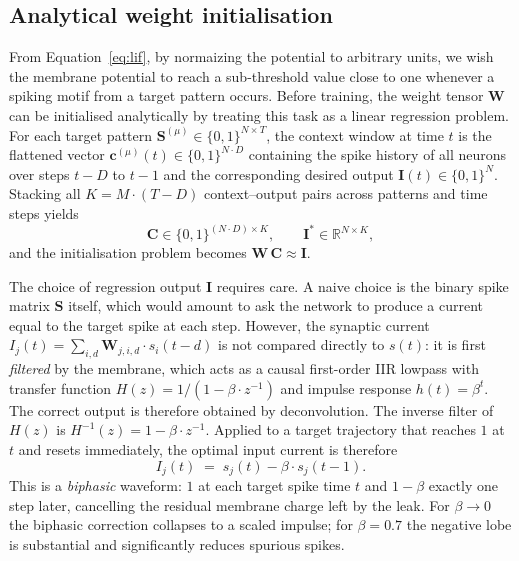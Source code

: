 \documentclass{scrartcl}
\begin{document}
\subsection{Analytical weight initialisation}
\label{sec:init}
From Equation~\ref{eq:lif}, by normaizing the potential to arbitrary units, we wish the membrane potential to reach a sub-threshold value close to one whenever a spiking motif from a target pattern occurs. Before training, the weight tensor $\mathbf{W}$ can be initialised analytically by treating this task as a linear regression problem. For each target pattern $\mathbf{S}^{(\mu)} \in \{0,1\}^{N \times T}$, the context window at time $t$ is the flattened vector $\mathbf{c}^{(\mu)}(t) \in \{0,1\}^{N \cdot D}$ containing the spike history of all neurons over steps $t-D$ to $t-1$ and the corresponding desired output $\mathbf{I}(t) \in \{0,1\}^N$. Stacking all $K = M \cdot (T-D)$ context--output pairs across patterns and time steps yields
\[
  \mathbf{C} \in \{0,1\}^{(N \cdot D) \times K},
  \qquad
  \mathbf{I}^* \in \mathbb{R}^{N \times K},
\]
and the initialisation problem becomes $\mathbf{W}\,\mathbf{C} \approx \mathbf{I}$.

The choice of regression output $\mathbf{I}$ requires care. A naive choice is the binary spike matrix $\mathbf{S}$ itself, which would amount to ask the network to produce a current equal to the target spike at each step. However, the synaptic current $I_j(t) = \sum_{i,d} \mathbf{W}_{j,i,d} \cdot s_i(t-d)$ is not compared directly to $s(t)$: it is first \emph{filtered} by the membrane, which acts as a causal first-order IIR lowpass with transfer function $H(z) = 1/(1 - \beta \cdot z^{-1})$ and impulse response $h(t) = \beta^t$. The correct output is therefore obtained by deconvolution.  The inverse filter of $H(z)$ is $H^{-1}(z) = 1 - \beta \cdot z^{-1}$. Applied to a target trajectory that reaches $1$ at $t$ and resets immediately, the optimal input current is therefore
\begin{equation}
  I_j(t) \;=\; s_j(t) - \beta \cdot s_j(t-1).
  \label{eq:deconv_target}
\end{equation}
This is a \emph{biphasic} waveform: $1$ at each target spike time $t$ and $1-\beta$ exactly one step later, cancelling the residual membrane charge left by the leak. For $\beta \to 0$ the biphasic correction collapses to a scaled impulse; for $\beta = 0.7$ the negative lobe is substantial and significantly reduces spurious spikes.
 
\end{document}
